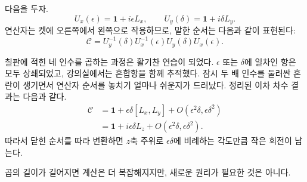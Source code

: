 다음을 두자.
\begin{equation}
U_x(\epsilon)=\mathbf 1+i\epsilon L_x,
\qquad
U_y(\delta)=\mathbf 1+i\delta L_y.
\end{equation}
연산자는 켓에 오른쪽에서 왼쪽으로 작용하므로, 말한 순서는 다음과 같이 표현된다:
\begin{equation}
\mathcal C
=U_y^{-1}(\delta)U_x^{-1}(\epsilon)
 U_y(\delta)U_x(\epsilon).
\end{equation}

\begin{classroomqa}
\end{classroomqa}

칠판에 적힌 네 인수를 곱하는 과정은 활기찬 연습이 되었다. \(\epsilon\) 또는 \(\delta\)에 일차인 항은 모두 상쇄되었고, 강의실에서는 혼합항을 함께 추적했다. 잠시 두 배 인수를 둘러싼 혼란이 생기면서 연산자 순서를 놓치기 얼마나 쉬운지가 드러났다. 정리된 이차 차수 결과는 다음과 같다.
\begin{align}
\mathcal C
&=\mathbf 1+\epsilon\delta[L_x,L_y]
  +O(\epsilon^2\delta,\epsilon\delta^2)\\
&=\mathbf 1+i\epsilon\delta L_z
  +O(\epsilon^2\delta,\epsilon\delta^2).
\end{align}
따라서 닫힌 순서를 따라 변환하면 \(z\)축 주위로 \(\epsilon\delta\)에 비례하는 각도만큼 작은 회전이 남는다. 

\begin{classroomqa}
\end{classroomqa}

곱의 길이가 길어지면 계산은 더 복잡해지지만, 새로운 원리가 필요한 것은 아니다.

\begin{classroomqa}
\end{classroomqa}

